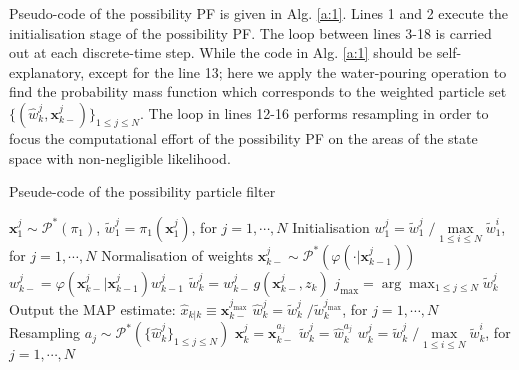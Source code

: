 \documentclass{llncs}
\newcommand{\xb}{\mathbf{x}}
\begin{document}
Pseudo-code of the possibility PF is given in Alg. \ref{a:1}.  Lines 1 and 2 execute the initialisation stage of the possibility PF. The loop between lines 3-18 is carried out at each discrete-time step. While the code in Alg. \ref{a:1} should be self-explanatory, except for the line 13; here we apply the water-pouring operation to find the probability mass function which corresponds to the weighted particle set $\{(\widehat{w}^j_k,\xb^j_{k-})\}_{1\leq j\leq N}$. The loop in lines 12-16 performs resampling in order to focus the computational effort of the possibility PF on the areas of the state space with non-negligible likelihood.

\begin{algorithm}[htb]
\caption{Pseude-code of the possibility particle filter}
{
\begin{algorithmic}[1]
\State  $\xb_{1}^j \sim \mathcal{P}^*(\pi_1)$, $\tilde{w}_{1}^j = \pi_1(\xb_{1}^j)$, for
$j=1,\cdots,N$ \Comment Initialisation
\State  $w_{1}^j =  \tilde{w}_{1}^j \; / \max\limits_{1\leq i \leq N}  \tilde{w}_{1}^i$, for $j=1,\cdots,N$ \Comment Normalisation of weights
        \State  $\xb_{k-}^j \sim \mathcal{P}^*\left(\varphi(\cdot|\xb_{k-1}^j)\right)$
        \State $w_{k-}^j = \varphi(\xb_{k-}^j|\xb^j_{k-1}) w_{k-1}^j$
        \State $\tilde{w}^j_{k} = w^j_{k-}\,g(\xb^j_{k-},z_k)$
    \EndFor
    \State $j_{\max} = \arg\max_{1\leq j \leq N}  \tilde{w}_{k}^j$
    \State Output the MAP estimate: $\widehat{x}_{k|k} \equiv \xb^{j_{\max}}_{k-}$
    \State  $\widehat{w}_{k}^j =  \tilde{w}_{k}^j \; / \tilde{w}_k^{j_{\max}}$, for $j=1,\cdots,N$
      \Comment Resampling
        \State $a_j \sim \mathcal{P}^*(\{\widehat{w}_{k}^j\}_{1\leq j \leq N})$
        \State $\xb^j_{k} = \xb^{a_j}_{k-}$
        \State $\tilde{w}_k^j = \widehat{w}_{k}^{a_j}$
    \EndFor
   \State  $w_{k}^j =  \tilde{w}_{k}^j \; / \max\limits_{1\leq i \leq N}  \tilde{w}_{k}^i$, for $j=1,\cdots,N$
\EndFor
\end{algorithmic}
} \label{a:1}
\end{algorithm}
\end{document}
